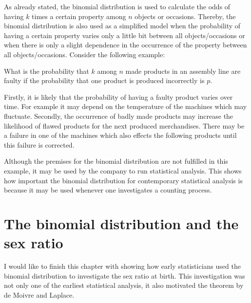 As already stated, the binomial distribution is used to calculate the odds of having $k$ times a certain property among $n$ objects or occasions. Thereby, the binomial distribution is also used as a simplified model when the probability of having a certain property varies only a little bit between all objects/occasions or when there is only a slight dependence in the occurrence of the property between all objects/occasions. Consider the following example:

\begin{example}
  What is the probability that $k$ among $n$ made products in an assembly line are faulty if the probability that one product is produced incorrectly is $p$.
\end{example}

Firstly, it is likely that the probability of having a faulty product varies over time. For example it may depend on the temperature of the machines which may fluctuate. Secondly, the occurrence of badly made products may increase the likelihood of flawed products for the next produced merchandises. There may be a failure in one of the machines which also effects the following products until this failure is corrected.

Although the premises for the binomial distribution are not fulfilled in this example, it may be used by the company to run statistical analysis. This shows how important the binomial distribution for contemporary statistical analysis is because it may be used whenever one investigates a counting process.

\section{The binomial distribution and the sex ratio}


I would like to finish this chapter with showing how early statisticians used the binomial distribution to investigate the sex ratio at birth. This investigation was not only one of the earliest statistical analysis, it also motivated the theorem by de Moivre and Laplace.

